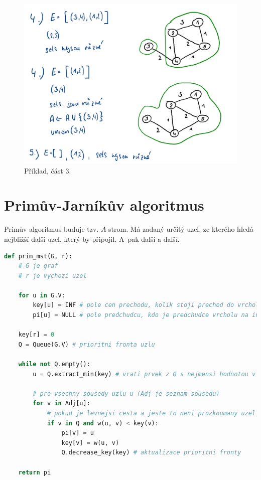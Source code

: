 \begin{figure}[H]
    \centering
    \includegraphics[width=0.9\linewidth]{03-minimalni-kostry-13.pdf}
    \caption{Příklad, část 3.}
\end{figure}


\section{Primův-Jarníkův algoritmus}

Primův algoritmus buduje tzv. $A$ strom. Má zadaný určitý uzel, ze kterého hledá nejbližší další uzel, který by připojil. A~pak další a další.

\bigskip\noindent\begin{minipage}{\linewidth}
    \begin{lstlisting}[language=Python, caption={Primův algoritmus.}]
def prim_mst(G, r):
    # G je graf
    # r je vychozi uzel

    for u in G.V:
        key[u] = INF # pole cen prechodu, kolik stoji prechod do vrcholu na indexu
        pi[u] = NULL # pole predchudcu, kdo je predchudce vrcholu na indexu

    key[r] = 0
    Q = Queue(G.V) # prioritni fronta uzlu

    while not Q.empty():
        u = Q.extract_min(key) # vrati prvek z Q s nejmensi hodnotou v key

        # pro vsechny sousedy uzlu u (Adj je seznam sousedu)
        for v in Adj[u]:
            # pokud je levnejsi cesta a jeste to neni prozkoumany uzel
            if v in Q and w(u, v) < key(v):
                pi[v] = u
                key[v] = w(u, v)
                Q.decrease_key(key) # aktualizace prioritni fronty

    return pi
\end{lstlisting}
\end{minipage}

